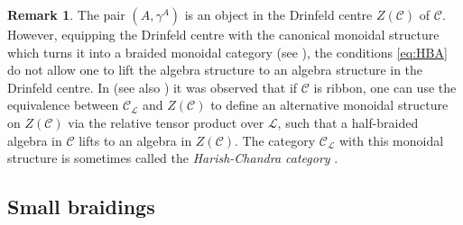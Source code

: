 \documentclass[12pt,dvipsnames]{article}
\numberwithin{equation}{section}
\theoremstyle{definition}
\newtheorem{remark}[definition]{Remark}
\newcommand{\cat}[1]{\mathcal{#1}}
\newcommand{\1}{\ensuremath{\mathbbm{1}}}
\begin{document}
\begin{remark}
    The pair $(A,\gamma^A)$ is an object in the Drinfeld centre $Z(\cat{C})$ of $\cat{C}$. However, equipping the Drinfeld centre with the canonical monoidal structure which turns it into a braided monoidal category (see \cite[Sec.\,8.5]{EGNO15}), the conditions \eqref{eq:HBA} do not allow one to lift the algebra structure to an algebra structure in the Drinfeld centre. In \cite[Cor.\,4.6]{BBJ16} (see also \cite[Def.\,2.47]{JR21}) it was observed that if $\cat{C}$ is ribbon, one can use the equivalence between $\cat{C}_\mathcal{L}$ and $Z(\cat{C})$ to define an alternative monoidal structure on $Z(\cat{C})$ via the relative tensor product over $\cat{L}$, such that a half-braided algebra in $\cat{C}$ lifts to an algebra in $Z(\cat{C})$. The category $\cat{C}_\mathcal{L}$ with this monoidal structure is sometimes called the \emph{Harish-Chandra category} \cite[Sec.\,2.5]{GJS19}.
\end{remark}

\subsection{Small braidings}\label{ssec:SmallBraidings}
\end{document}
